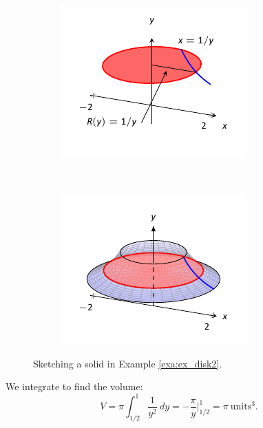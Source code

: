 \begin{solution}
{\begin{figure}[H]
	\centering
	\begin{subfigure}[t]{0.5\textwidth}
		\includegraphics[width=\textwidth]{figures/figdisk1a}
		\label{fig:disk1a}
		\caption{} 
	\end{subfigure}%
	~ 
	\begin{subfigure}[t]{0.5\textwidth}    
		\includegraphics[width=\textwidth]{figures/figdisk2a}
		\label{fig:disk2a}
		\caption{}    
	\end{subfigure} 
	\caption{Sketching a solid in Example \ref{exa:ex_disk2}. \label{fig:disk2}}
\end{figure}	



	We integrate to find the volume:
\[
V = \pi\int_{1/2}^1 \frac{1}{y^2}\ dy  = -\frac{\pi}y\Big|_{1/2}^1  = \pi\ \text{units}^3.
\]
}
	
\end{solution}	


